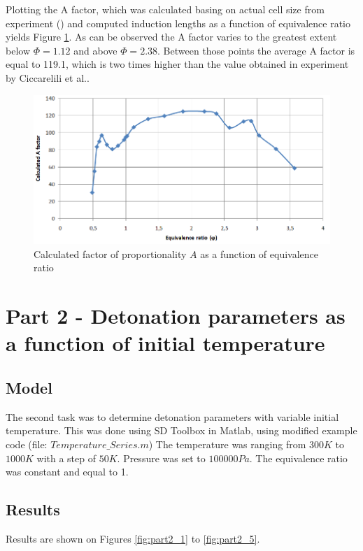 \documentclass[a4paper]{article}
\begin{document}
Plotting the A factor, which was calculated basing on actual cell size from experiment (\cite{Guirao}) and computed induction lengths as a function of equivalence ratio yields Figure \ref{fig:A_exp}. As can be observed the A factor varies to the greatest extent below $\Phi = 1.12$ and above $\Phi = 2.38$. Between those points the average A factor is equal to 119.1, which is two times higher than the value obtained in experiment by Ciccarelili et al.\cite{Ciccarelli}.

\begin{figure}[H]
\centering
\includegraphics[width=1\textwidth]{1_A_calculated.PNG}
\caption{\label{fig:A_exp}Calculated factor of proportionality $A$ as a function of equivalence ratio}
\end{figure}

\section{Part 2 - Detonation parameters as a function of initial temperature}
\subsection{Model}

The second task was to determine detonation parameters with variable initial temperature. This was done using SD Toolbox in Matlab, using modified example code (file: $Temperature\_Series.m$) The temperature was ranging from $300 K$ to $1000  K$ with a step of $50 K$. Pressure was set to $100000 Pa$. The equivalence ratio was constant and equal to 1.
\subsection{Results}

Results are shown on Figures \ref{fig:part2_1} to \ref{fig:part2_5}.
\end{document}
